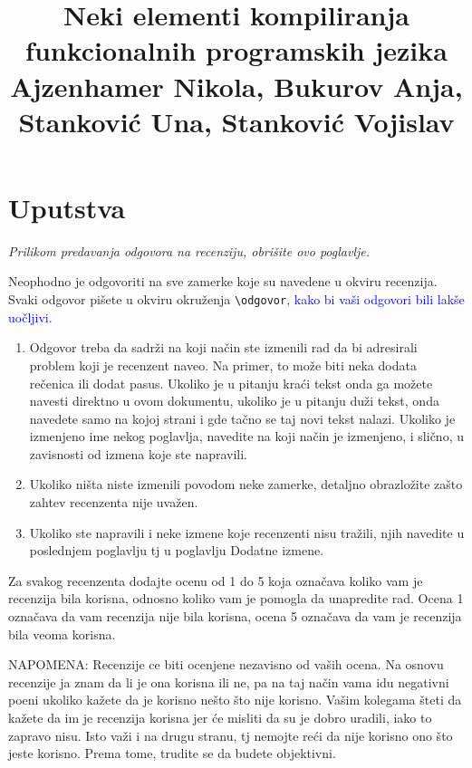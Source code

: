 \documentclass[a4paper]{report}
\newcommand{\odgovor}[1]{\textcolor{blue}{#1}}
\begin{document}
\title{Neki elementi kompiliranja funkcionalnih programskih jezika\\ \small{Ajzenhamer Nikola, Bukurov Anja, Stanković Una, Stanković Vojislav}}

\maketitle

\tableofcontents

\chapter{Uputstva}
\emph{Prilikom predavanja odgovora na recenziju, obrišite ovo poglavlje.}

Neophodno je odgovoriti na sve zamerke koje su navedene u okviru recenzija. Svaki odgovor pišete u okviru okruženja \verb"\odgovor", \odgovor{kako bi vaši odgovori bili lakše uočljivi.} 
\begin{enumerate}

\item Odgovor treba da sadrži na koji način ste izmenili rad da bi adresirali problem koji je recenzent naveo. Na primer, to može biti neka dodata rečenica ili dodat pasus. Ukoliko je u pitanju kraći tekst onda ga možete navesti direktno u ovom dokumentu, ukoliko je u pitanju duži tekst, onda navedete samo na kojoj strani i gde tačno se taj novi tekst nalazi. Ukoliko je izmenjeno ime nekog poglavlja, navedite na koji način je izmenjeno, i slično, u zavisnosti od izmena koje ste napravili. 

\item Ukoliko ništa niste izmenili povodom neke zamerke, detaljno obrazložite zašto zahtev recenzenta nije uvažen.

\item Ukoliko ste napravili i neke izmene koje recenzenti nisu tražili, njih navedite u poslednjem poglavlju tj u poglavlju Dodatne izmene.
\end{enumerate}

Za svakog recenzenta dodajte ocenu od 1 do 5 koja označava koliko vam je recenzija bila korisna, odnosno koliko vam je pomogla da unapredite rad. Ocena 1 označava da vam recenzija nije bila korisna, ocena 5 označava da vam je recenzija bila veoma korisna. 

NAPOMENA: Recenzije ce biti ocenjene nezavisno od vaših ocena. Na osnovu recenzije ja znam da li je ona korisna ili ne, pa na taj način vama idu negativni poeni ukoliko kažete da je korisno nešto što nije korisno. Vašim kolegama šteti da kažete da im je recenzija korisna jer će misliti da su je dobro uradili, iako to zapravo nisu. Isto važi i na drugu stranu, tj nemojte reći da nije korisno ono što jeste korisno. Prema tome, trudite se da budete objektivni. 
\end{document}

